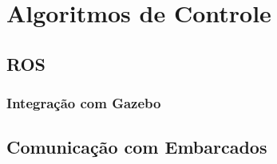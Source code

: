 \documentclass[../delivery_hospital_report.tex]{subfiles}
\begin{document}
\chapter{Algoritmos de Controle}
\section{ROS}
\subsection{Integração com Gazebo}
\section{Comunicação com Embarcados}
\end{document}
